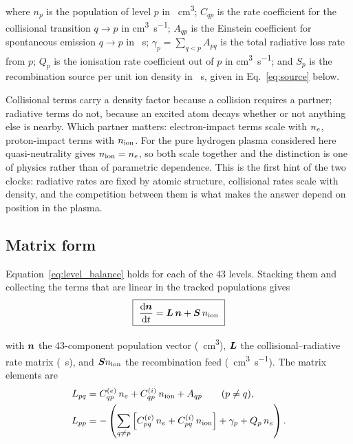 \noindent where $n_p$ is the population of level $p$ in \si{\per\cubic\centi\metre};
$C_{qp}$ is the rate coefficient for the collisional transition $q \to p$ in
\si{\cubic\centi\metre\per\second}; $A_{qp}$ is the Einstein coefficient for
spontaneous emission $q \to p$ in \si{\per\second}; $\gamma_p = \sum_{q<p}A_{pq}$
is the total radiative loss rate from $p$; $Q_p$ is the ionisation rate
coefficient out of $p$ in \si{\cubic\centi\metre\per\second}; and $S_p$ is the
recombination source per unit ion density in \si{\per\second}, given in
Eq.~\eqref{eq:source} below.

Collisional terms carry a density factor because a collision requires a
partner; radiative terms do not, because an excited atom decays whether or not
anything else is nearby. Which partner matters: electron-impact terms scale with
$n_e$, proton-impact terms with $n_{\mathrm{ion}}$. For the pure hydrogen plasma
considered here quasi-neutrality gives $n_{\mathrm{ion}} = n_e$, so both scale together and
the distinction is one of physics rather than of parametric dependence. This is the first hint of the
two clocks: radiative rates are fixed by atomic structure, collisional rates
scale with density, and the competition between them is what makes the answer
depend on position in the plasma.

\subsection{Matrix form}

Equation~\eqref{eq:level_balance} holds for each of the 43 levels. Stacking
them and collecting the terms that are linear in the tracked populations gives
\begin{equation}
  \boxed{\ \frac{\mathrm{d}\nvec}{\mathrm{d}t} = \Lmat\,\nvec + \Svec\,\nion\ }
  \label{eq:master}
\end{equation}

\noindent with $\bm{n}$ the 43-component population vector
(\si{\per\cubic\centi\metre}), $\bm{L}$ the collisional--radiative rate matrix
(\si{\per\second}), and $\bm{S}n_{\mathrm{ion}}$ the recombination feed
(\si{\per\cubic\centi\metre\per\second}). The matrix elements are
\begin{align}
  L_{pq} &= C^{(e)}_{qp}\,n_e + C^{(i)}_{qp}\,n_{\mathrm{ion}} + A_{qp}
            \qquad (p \neq q),
  \label{eq:L_offdiag}\\
  L_{pp} &= -\left(\sum_{q\neq p}
            \left[C^{(e)}_{pq}\,n_e + C^{(i)}_{pq}\,n_{\mathrm{ion}}\right]
            + \gamma_p + Q_p\,n_e\right).
  \label{eq:L_diag}
\end{align}

